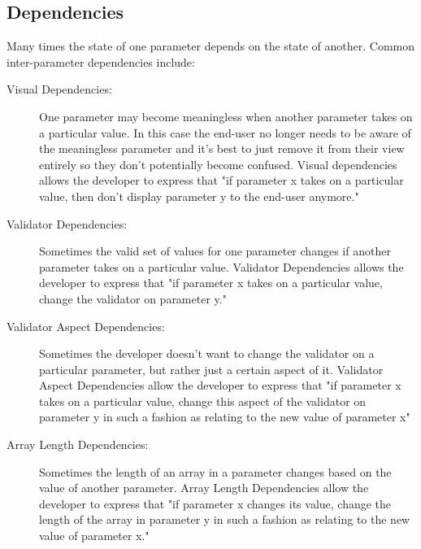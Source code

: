 	\subsection{Dependencies}
	Many times the state of one parameter depends on the state of another. Common inter-parameter dependencies include:
	\begin{description}
		\item[Visual Dependencies:] One parameter may become meaningless when another parameter takes on a particular value.
		In this case the end-user no longer needs to be aware of the meaningless parameter and it's best to just remove it from
		their view entirely so they don't potentially become confused. Visual dependencies allows the developer to express that "if parameter 
		x takes on a particular value, then don't display parameter y to the end-user anymore."
		\item[Validator Dependencies:] Sometimes the valid set of values for one parameter changes if another parameter takes
		on a particular value. Validator Dependencies allows the developer to express that "if parameter x takes on a particular value, change
		the validator on parameter y."
		\item[Validator Aspect Dependencies:] Sometimes the developer doesn't want to change the validator on a particular parameter, but
		rather just a certain aspect of it. Validator Aspect Dependencies allow the developer to express that "if parameter x takes on a particular value,
		change this aspect of the validator on parameter y in such a fashion as relating to the new value of parameter x"
		\item[Array Length Dependencies:] Sometimes the length of an array in a parameter changes based on the value of another parameter.
		Array Length Dependencies allow the developer to express that "if parameter x changes its value, change the length of the array
		in parameter y in such a fashion as relating to the new value of parameter x."
	\end{description}

